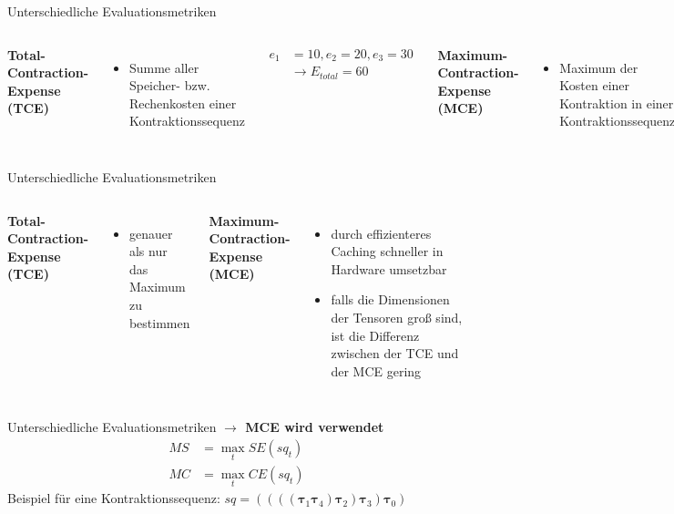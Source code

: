 \documentclass{beamer}
\newcommand{\tauB}{\bm{\tau}}
\begin{document}
\begin{frame}{Unterschiedliche Evaluationsmetriken}
	\begin{columns}[]

		\textbf{Total-Contraction-Expense (TCE)}
		\begin{itemize}
			\item Summe aller Speicher- bzw. Rechenkosten einer Kontraktionssequenz
		\end{itemize}
		\begin{align*}
			e_1 & = 10, e_2 = 20, e_3 = 30   \\
			    & \rightarrow E_{total} = 60
		\end{align*}


		\textbf{Maximum-Contraction-Expense (MCE)}
		\begin{itemize}
			\item Maximum der Kosten einer Kontraktion in einer Kontraktionssequenz
		\end{itemize}
		\begin{align*}
			e_1 & = 10, e_2 = 20, e_3 = 30 \\
			    & \rightarrow E_{max} = 30
		\end{align*}
	\end{columns}
\end{frame}

\begin{frame}{Unterschiedliche Evaluationsmetriken}
	\begin{columns}
		\textbf{Total-Contraction-Expense (TCE)}
		\begin{itemize}
			\item genauer als nur das Maximum zu bestimmen
		\end{itemize}


		\textbf{Maximum-Contraction-Expense (MCE)}
		\begin{itemize}
			\item durch effizienteres Caching schneller in Hardware umsetzbar
			\item falls die Dimensionen der Tensoren groß sind, ist die Differenz zwischen der TCE und der MCE gering
		\end{itemize}

	\end{columns}
\end{frame}

\begin{frame}{Unterschiedliche Evaluationsmetriken}
	\textbf{$\rightarrow$ MCE wird verwendet}
	\begin{align*}
		MS & = \max_t SE(sq_t) \\ MC &= \max_t CE(sq_t)
	\end{align*}
	Beispiel für eine Kontraktionssequenz:
	$sq = ((((\tauB_{1} \tauB_{4}) \tauB_{2}) \tauB_{3}) \tauB_{0})$
\end{frame}
\end{document}
